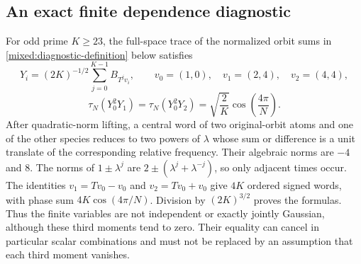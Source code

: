 \subsection{An exact finite dependence diagnostic}
For odd prime $K\geq23$, the full-space trace of the normalized orbit sums in \eqref{mixed:diagnostic-definition} below satisfies
\[
 Y_i=(2K)^{-1/2}\sum_{j=0}^{K-1}B_{T^jv_i},\qquad
 v_0=(1,0),\quad v_1=(2,4),\quad v_2=(4,4),
 \tag{MX.M9}\label{mixed:diagnostic-definition}
\]
\[
 \tau_N(Y_0^2Y_1)=\tau_N(Y_0^2Y_2)
              =\sqrt{\frac2K}\cos\!\left(\frac{4\pi}{N}\right).
 \tag{MX.M10}
\]
After quadratic-norm lifting, a central word of two original-orbit atoms and one of the other species reduces to two powers of $\lambda$ whose sum or difference is a unit translate of the corresponding relative frequency. Their algebraic norms are $-4$ and $8$. The norms of $1\pm\lambda^j$ are $2\pm(\lambda^j+\lambda^{-j})$, so only adjacent times occur. The identities $v_1=Tv_0-v_0$ and $v_2=Tv_0+v_0$ give $4K$ ordered signed words, with phase sum $4K\cos(4\pi/N)$. Division by $(2K)^{3/2}$ proves the formulas. Thus the finite variables are not independent or exactly jointly Gaussian, although these third moments tend to zero. Their equality can cancel in particular scalar combinations and must not be replaced by an assumption that each third moment vanishes.
